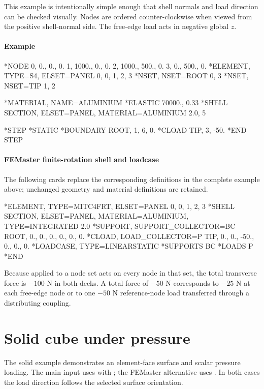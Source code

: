 This example is intentionally simple enough that shell normals and load direction can be checked visually. Nodes are ordered counter-clockwise when viewed from the positive shell-normal side. The free-edge load acts in negative global \(z\).

\paragraph*{Example}

\begin{inputdeck}
*NODE
0,    0.,   0., 0.
1, 1000.,   0., 0.
2, 1000., 500., 0.
3,    0., 500., 0.
*ELEMENT, TYPE=S4, ELSET=PANEL
0, 0, 1, 2, 3
*NSET, NSET=ROOT
0, 3
*NSET, NSET=TIP
1, 2

*MATERIAL, NAME=ALUMINIUM
*ELASTIC
70000., 0.33
*SHELL SECTION, ELSET=PANEL,
 MATERIAL=ALUMINIUM
2.0, 5

*STEP
*STATIC
*BOUNDARY
ROOT, 1, 6, 0.
*CLOAD
TIP, 3, -50.
*END STEP
\end{inputdeck}

\paragraph*{FEMaster finite-rotation shell and loadcase}

The following cards replace the corresponding definitions in the
complete example above; unchanged geometry and material definitions
are retained.

\begin{inputdeck}
*ELEMENT, TYPE=MITC4FRT, ELSET=PANEL
0, 0, 1, 2, 3
*SHELL SECTION, ELSET=PANEL, MATERIAL=ALUMINIUM, TYPE=INTEGRATED
2.0
*SUPPORT, SUPPORT_COLLECTOR=BC
ROOT, 0., 0., 0., 0., 0., 0.
*CLOAD, LOAD_COLLECTOR=P
TIP, 0., 0., -50., 0., 0., 0.
*LOADCASE, TYPE=LINEARSTATIC
*SUPPORTS
BC
*LOADS
P
*END
\end{inputdeck}

Because  applied to a node set acts on every node in that set, the total transverse force is \(-100\) N in both decks. A total force of \(-50\) N corresponds to \(-25\) N at each free-edge node or to one \(-50\) N reference-node load transferred through a distributing coupling.

\section{Solid cube under pressure}

The solid example demonstrates an element-face surface and scalar
pressure loading. The main input uses  with ;
the FEMaster alternative uses . In both cases the load
direction follows the selected surface orientation.

